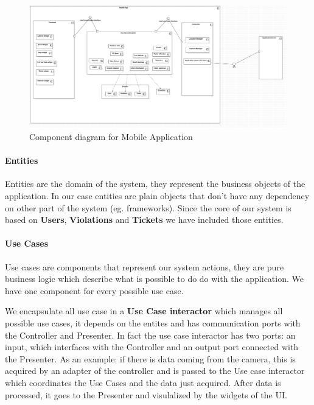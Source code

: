 \begin{figure}
\centering
\includegraphics[width=\textwidth]{Images/ComponentDiagram1.png}
\caption{\label{fig:compdiag1} Component diagram for Mobile Application}
\end{figure}

\paragraph{Entities}
Entities are the domain of the system, they represent the business objects of the application. In our case entities are plain objects that don't have any dependency on other part of the system (eg. frameworks).
Since the core of our system is based on \textbf{Users}, \textbf{Violations} and \textbf{Tickets} we have included those entities.

\paragraph{Use Cases}
Use cases are components that represent our system actions, they are pure business logic which describe what is possible to do do with the application. We have one component for every possible use case.

We encapsulate all use case in a \textbf{Use Case interactor} which manages all possible use cases, it depends on the entites and has communication ports with the Controller and Presenter.
In fact the use case interactor has two ports: an input, which interfaces with the Controller and an output port connected with the Presenter. As an example: if there is data coming from the camera, this is acquired by an adapter of the controller and is passed to the Use case interactor which coordinates the Use Cases and the data just acquired. After data is processed, it goes to the Presenter and visulalized by the widgets of the UI.

